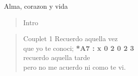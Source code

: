 \begin{song}[vals]{Alma, corazon y vida}
\begin{verse}{Intro}
	 \hspace{0.4cm} \hspace{0.4cm} \hspace{0.4cm} \hspace{0.4cm} \hspace{0.4cm}\hspace{0.4cm}  \hspace{0.4cm}
\end{verse}

\begin{verse}{Couplet 1}
	\hspace{0.6cm}Recuerdo aquella vez\\
	\hspace{0.6cm}que yo te conoci; \hspace{7cm} \small{\textbf{*A7 : x 0 2 0 2 3}}\\
	\hspace*{0.6cm}recuerdo aquella tarde\\
	\hspace*{0.6cm}pero no me acuerdo ni como te vi.\hspace{0.5cm}
\end{verse}


\end{song}
